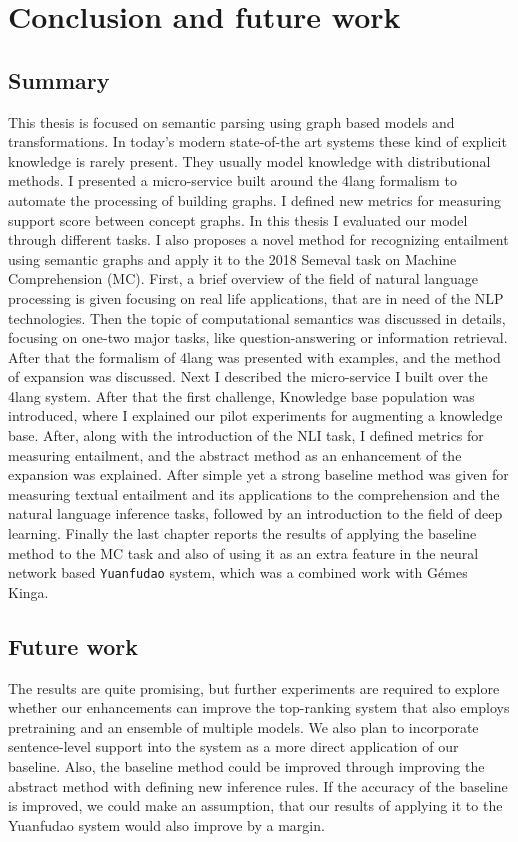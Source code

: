 \chapter{Conclusion and future work}
\label{chap:future}

\section{Summary}
This thesis is focused on semantic parsing using graph based models and transformations. In today's modern state-of-the art systems these kind of explicit knowledge is rarely present. They usually model knowledge with distributional methods. I presented a micro-service built around the 4lang formalism to automate the processing of building graphs. I defined new metrics for measuring support score between concept graphs. In this thesis I evaluated our model through different tasks. I also proposes a novel method for recognizing entailment using semantic
graphs and apply it to the 2018 Semeval task on Machine
Comprehension (MC). First, a brief overview of the field of natural language processing is given focusing on real life applications, that are in need of the NLP technologies. Then the topic of computational semantics was discussed in details, focusing on one-two major tasks, like question-answering or information retrieval. After that the formalism of 4lang was presented with examples, and the method of expansion was discussed. Next I described the micro-service I built over the 4lang system. After that the first challenge, Knowledge base population was introduced, where I explained our pilot experiments for augmenting a knowledge base. After, along with the introduction of the NLI task, I defined metrics for measuring entailment, and the abstract method as an enhancement of the expansion was explained. After simple yet a strong baseline method was given for measuring
textual entailment and its applications to the comprehension and the natural language inference tasks, followed by an introduction to the field of deep learning. Finally the last chapter reports the results of applying the baseline method
to the MC task and also of using it as an extra feature in the neural network
based \texttt{Yuanfudao} system, which was a combined work with G\'emes Kinga.

\section{Future work}
The results are quite promising, but
further experiments are required to explore whether our enhancements can
improve the top-ranking system that also employs
pretraining and an ensemble of multiple models.
We also plan to incorporate sentence-level support
into the system as a more direct application of our
baseline. Also, the baseline method could be improved through improving the abstract method with defining new inference rules. If the accuracy of the baseline is improved, we could make an assumption, that our results of applying it to the Yuanfudao system would also improve by a margin.

